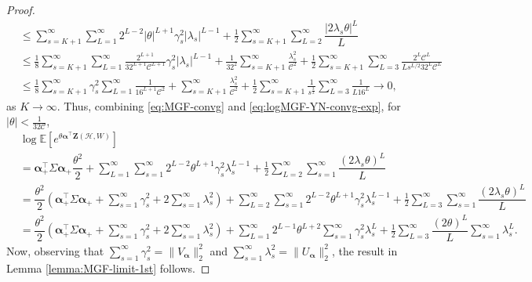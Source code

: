 \documentclass[11pt,reqno]{amsart}
\numberwithin{equation}{section}
\theoremstyle{definition}
\begin{document}
\begin{proof}
\begin{align}
       & \leq \sum_{s=K+1}^{\infty}\sum_{L = 1}^{\infty}2^{L-2}|\theta|^{L+1} \gamma_{s}^{2}|\lambda_{s}|^{L-1}
     + \frac{1}{2}\sum_{s=K+1}^{\infty}\sum_{L=2}^{\infty}\dfrac{\left|2\lambda_{s} \theta\right|^{L}}{L}\nonumber\\
    &\leq \frac{1}{8}\sum_{s=K+1}^{\infty}\sum_{L=1}^{\infty}\frac{2^{L+1}}{32^{L+1}\mathcal{C}^{L+1}}\gamma_{s}^{2}|\lambda_{s}|^{L-1} + \frac{1}{32^{2}}\sum_{s=K+1}^{\infty}\frac{\lambda_{s}^{2}}{\mathcal{C}^{2}} + \frac{1}{2}\sum_{s=K+1}^{\infty}\sum_{L=3}^{\infty}\frac{2^{L}\mathcal{C}^{L}}{L s^{L/2}32^{L}\mathcal{C}^{L}}\nonumber\\
     &\leq \frac{1}{8}\sum_{s=K+1}^{\infty}\gamma_{s}^{2}\sum_{L=1}^{\infty}\frac{1}{16^{L+1}\mathcal{C}^{2}}  + \sum_{s=K+1}^{\infty}\frac{\lambda_{s}^{2}}{\mathcal{C}^{2}}  + \frac{1}{2}\sum_{s=K+1}^{\infty}\frac{1}{s^\frac{3}{2}}\sum_{L=3}^{\infty}\frac{1}{L16^{L}}   \rightarrow 0,
\end{align}
as $K \rightarrow \infty$.
Thus,  combining \eqref{eq:MGF-convg} and \eqref{eq:logMGF-YN-convg-exp},  for $|\theta|<\frac{1}{32\mathcal{C}}$,   
\begin{align*}
    & \log\mathbb{E}\left[ e^{\theta \bm{\alpha}^{\top}\bm{Z}(\bm{\mathcal{H}},W)} \right] \\ 
    &= \bm{\alpha}_{+}^{\top}\Sigma\bm{\alpha}_{+}\dfrac{\theta^{2}}{2} + \sum_{L = 1}^{\infty}\sum_{s=1}^{\infty}2^{L-2}\theta^{L+1}\gamma_{s}^{2}\lambda_{s}^{L-1}
     + \frac{1}{2}\sum_{L=2}^{\infty}\sum_{s=1}^{\infty}\dfrac{\left(2\lambda_{s}\theta\right)^{L}}{L}\\
    & = \dfrac{\theta^{2}}{2}\left(\bm{\alpha}_{+}^{\top}\Sigma\bm{\alpha}_{+} + \sum_{s=1}^{\infty}\gamma_{s}^{2} + 2\sum_{s=1}^{\infty}\lambda_{s}^{2}\right) + \sum_{L = 2}^{\infty}\sum_{s=1}^{\infty}2^{L-2}\theta^{L+1}\gamma_{s}^{2}\lambda_{s}^{L-1} + \frac{1}{2}\sum_{L=3}^{\infty}\sum_{s=1}^{\infty}\dfrac{\left(2\lambda_{s}\theta\right)^{L}}{L} \\ 
       & = \dfrac{\theta^{2}}{2}\left(\bm{\alpha}_{+}^{\top}\Sigma\bm{\alpha}_{+} + \sum_{s=1}^{\infty}\gamma_{s}^{2} + 2\sum_{s=1}^{\infty}\lambda_{s}^{2}\right) + \sum_{L = 1}^{\infty} 2^{L-1}\theta^{L+2} \sum_{s=1}^{\infty} \gamma_{s}^{2}\lambda_{s}^{L} + \frac{1}{2}\sum_{L=3}^{\infty}\dfrac{\left(2 \theta\right)^{L}}{L} \sum_{s=1}^{\infty} \lambda_{s}^L . 
\end{align*} 
Now, observing that $\sum_{s=1}^{\infty}\gamma_{s}^{2} = \|V_{\bm \alpha}\|_2^2$ and $\sum_{s=1}^{\infty}\lambda_{s}^{2} = \| U_{\bm \alpha} \|_2^2$, the result in Lemma \ref{lemma:MGF-limit-1st} follows.
\end{proof} 
\end{document}
